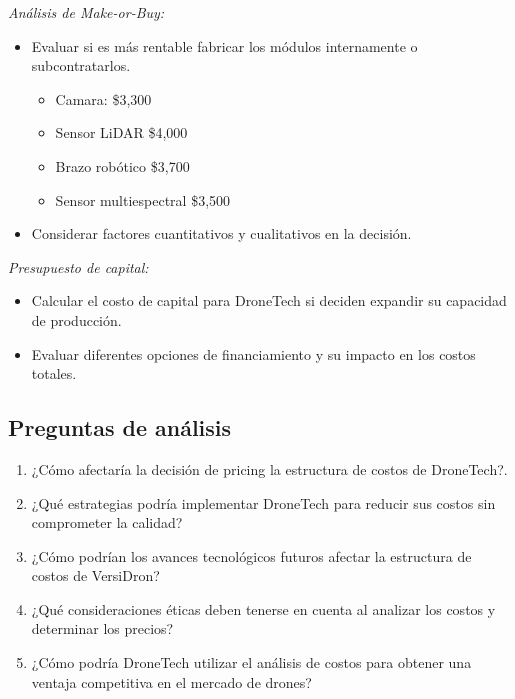 \documentclass[letterpaper,12pt]{article}
\begin{document}
\begin{sloppypar}
\begin{itemize}
\end{itemize}
\newpage
\textit{Análisis de Make-or-Buy:}
\begin{itemize}
    \item Evaluar si es más rentable fabricar los módulos internamente o
    subcontratarlos.
    \begin{itemize}
        \item Camara: \$3,300
        \item Sensor LiDAR \$4,000
        \item Brazo robótico \$3,700
        \item Sensor multiespectral \$3,500
    \end{itemize}
    \item Considerar factores cuantitativos y cualitativos en la decisión.
\end{itemize}
\textit{Presupuesto de capital:}
\begin{itemize}
    \item Calcular el costo de capital para DroneTech si deciden expandir su
    capacidad de producción.
    \item Evaluar diferentes opciones de financiamiento y su impacto en los costos
    totales.
\end{itemize}

\subsection*{Preguntas de análisis}
\begin{enumerate}
    \item ¿Cómo afectaría la decisión de pricing la estructura de costos de
    DroneTech?.
    \item ¿Qué estrategias podría implementar DroneTech para reducir sus costos sin
    comprometer la calidad?
    \item ¿Cómo podrían los avances tecnológicos futuros afectar la estructura de costos de VersiDron?
    \item ¿Qué consideraciones éticas deben tenerse en cuenta al analizar los costos
    y determinar los precios?
    \item ¿Cómo podría DroneTech utilizar el análisis de costos para obtener una
    ventaja competitiva en el mercado de drones?
\end{enumerate}


\end{sloppypar}
\end{document}
